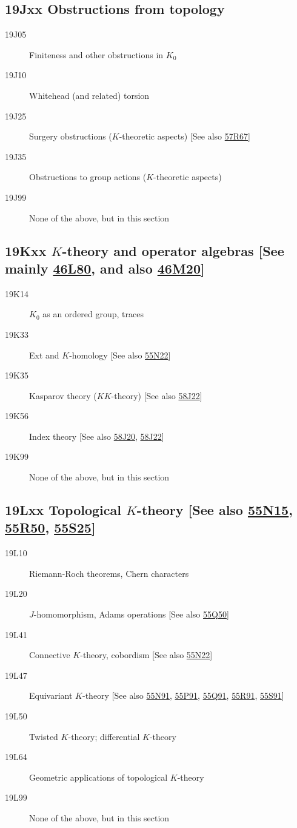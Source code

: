\subsection*{19Jxx  Obstructions from topology }\label{19Jxx}
\begin{description}  
\item [19J05]\label{19J05} Finiteness and other obstructions in $K_0$
\item [19J10]\label{19J10} Whitehead (and related) torsion
\item [19J25]\label{19J25} Surgery obstructions ($K$-theoretic aspects) [See also \hyperref[57R67]{57R67}]
\item [19J35]\label{19J35} Obstructions to group actions ($K$-theoretic aspects)
\item [19J99]\label{19J99} None of the above, but in this section
\end{description}
\subsection*{19Kxx  $K$-theory and operator algebras [See mainly \hyperref[46L80]{46L80}, and also \hyperref[46M20]{46M20}] }\label{19Kxx}
\begin{description}  
\item [19K14]\label{19K14} $K_0$ as an ordered group, traces
\item [19K33]\label{19K33} Ext and $K$-homology [See also \hyperref[55N22]{55N22}]
\item [19K35]\label{19K35} Kasparov theory ($KK$-theory) [See also \hyperref[58J22]{58J22}]
\item [19K56]\label{19K56} Index theory [See also \hyperref[58J20]{58J20}, \hyperref[58J22]{58J22}]
\item [19K99]\label{19K99} None of the above, but in this section
\end{description}
\subsection*{19Lxx  Topological $K$-theory [See also \hyperref[55N15]{55N15}, \hyperref[55R50]{55R50}, \hyperref[55S25]{55S25}] }\label{19Lxx}
\begin{description}  
\item [19L10]\label{19L10} Riemann-Roch theorems, Chern characters
\item [19L20]\label{19L20} $J$-homomorphism, Adams operations [See also \hyperref[55Q50]{55Q50}]
\item [19L41]\label{19L41} Connective $K$-theory, cobordism [See also \hyperref[55N22]{55N22}]
\item [19L47]\label{19L47} Equivariant $K$-theory [See also \hyperref[55N91]{55N91}, \hyperref[55P91]{55P91}, \hyperref[55Q91]{55Q91}, \hyperref[55R91]{55R91}, \hyperref[55S91]{55S91}]
\item [19L50]\label{19L50} Twisted $K$-theory; differential $K$-theory
\item [19L64]\label{19L64} Geometric applications of topological $K$-theory
\item [19L99]\label{19L99} None of the above, but in this section
\end{description}
